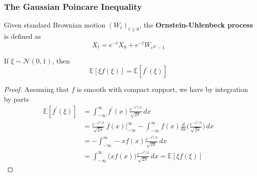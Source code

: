 \documentclass{article}
\begin{document}
  \subsubsection{The Gaussian Poincare Inequality}

  \begin{definition}
  Given standard Brownian motion $(W_t)_{t \geq 0}$, the \textbf{Ornstein-Uhlenbeck process} is defined as 
  \[X_t = e^{-t} X_0 + e^{-t} W_{e^{2t} - 1}\]
  \end{definition}

  \begin{lemma}
  If $\xi \sim \mathcal{N}(0, 1)$, then 
  \[\mathbb{E}[ \xi f(\xi)] = \mathbb{E}[f^\prime (\xi)]\]
  \end{lemma}
  \begin{proof}
  Assuming that $f$ is smooth with compact support, we have by integration by parts 
  \begin{align*}
      \mathbb{E}[f^\prime (\xi)] & = \int_{-\infty}^\infty f^\prime(x) \frac{e^{-x^2 / 2}}{\sqrt{2\pi}} \,dx \\ 
      & = \frac{e^{-x^2 / 2}}{\sqrt{2\pi}} \, f(x) \bigg|_{-\infty}^\infty - \int_{-\infty}^\infty f(x) \frac{d}{dx} \bigg(\frac{e^{-x^2 / 2}}{\sqrt{2\pi}}\bigg) \,dx \\
      & = - \int_{-\infty}^\infty -x f(x) \frac{e^{-x^2 / 2}}{\sqrt{2\pi}} \,dx \\
      & = \int_{-\infty}^\infty \big( x f(x)\big) \frac{e^{-x^2 / 2}}{\sqrt{2\pi}}\,dx = \mathbb{E}[\xi f(\xi)]
  \end{align*}
  \end{proof}
\end{document}
